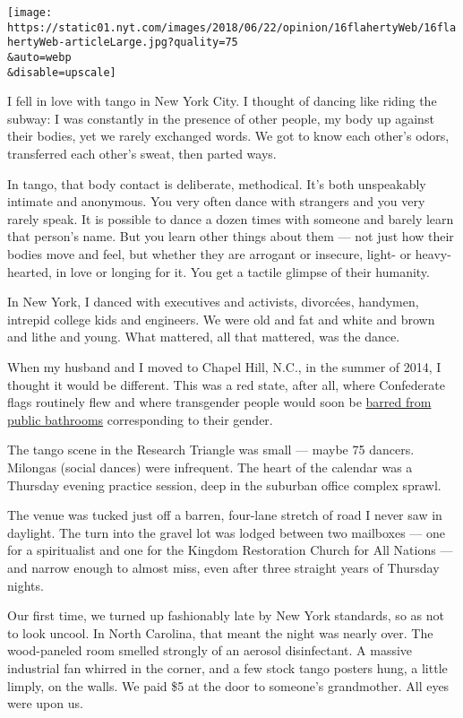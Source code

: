 \texttt{[image: https://static01.nyt.com/images/2018/06/22/opinion/16flahertyWeb/16flahertyWeb-articleLarge.jpg?quality=75\\\&auto=webp\\\&disable=upscale]}

I fell in love with tango in New York City. I thought of dancing like
riding the subway: I was constantly in the presence of other people, my
body up against their bodies, yet we rarely exchanged words. We got to
know each other's odors, transferred each other's sweat, then parted
ways.

In tango, that body contact is deliberate, methodical. It's both
unspeakably intimate and anonymous. You very often dance with strangers
and you very rarely speak. It is possible to dance a dozen times with
someone and barely learn that person's name. But you learn other things
about them --- not just how their bodies move and feel, but whether they
are arrogant or insecure, light- or heavy-hearted, in love or longing
for it. You get a tactile glimpse of their humanity.

In New York, I danced with executives and activists, divorcées,
handymen, intrepid college kids and engineers. We were old and fat and
white and brown and lithe and young. What mattered, all that mattered,
was the dance.

When my husband and I moved to Chapel Hill, N.C., in the summer of 2014,
I thought it would be different. This was a red state, after all, where
Confederate flags routinely flew and where transgender people would soon
be
\href{https://www.nytimes.com/2016/03/24/us/north-carolina-to-limit-bathroom-use-by-birth-gender.html}{barred
from public bathrooms} corresponding to their gender.

The tango scene in the Research Triangle was small --- maybe 75 dancers.
Milongas (social dances) were infrequent. The heart of the calendar was
a Thursday evening practice session, deep in the suburban office complex
sprawl.

The venue was tucked just off a barren, four-lane stretch of road I
never saw in daylight. The turn into the gravel lot was lodged between
two mailboxes --- one for a spiritualist and one for the Kingdom
Restoration Church for All Nations --- and narrow enough to almost miss,
even after three straight years of Thursday nights.

Our first time, we turned up fashionably late by New York standards, so
as not to look uncool. In North Carolina, that meant the night was
nearly over. The wood-paneled room smelled strongly of an aerosol
disinfectant. A massive industrial fan whirred in the corner, and a few
stock tango posters hung, a little limply, on the walls. We paid \$5 at
the door to someone's grandmother. All eyes were upon us.

